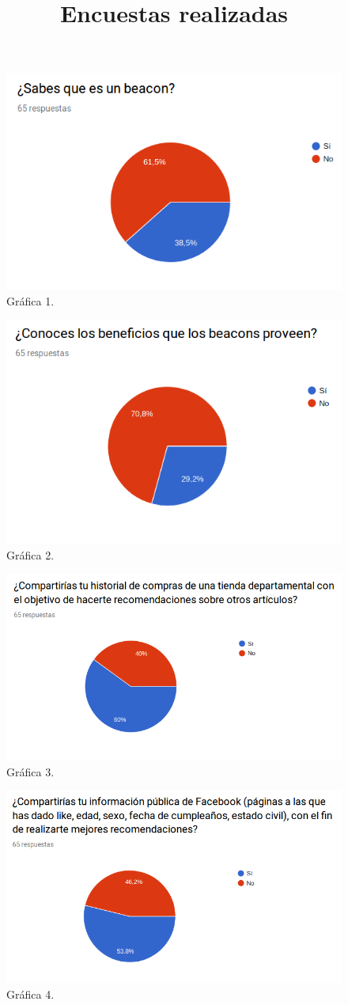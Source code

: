 \title{\textbf{Encuestas realizadas}}

\FloatBarrier
\begin{figure}[htbp!]
		\centering
			\includegraphics[width=.5 \textwidth]{imagenes/graficas/grafico1}
		\caption{Gráfica 1. }
\end{figure}
\FloatBarrier

\FloatBarrier
\begin{figure}[htbp!]
		\centering
			\includegraphics[width=.5 \textwidth]{imagenes/graficas/grafico2}
		\caption{Gráfica 2.}
\end{figure}
\FloatBarrier

\FloatBarrier
\begin{figure}[htbp!]
		\centering
			\includegraphics[width=.7 \textwidth]{imagenes/graficas/grafico3}
		\caption{Gráfica 3. }\end{figure}
\FloatBarrier

\FloatBarrier
\begin{figure}[htbp!]
		\centering
			\includegraphics[width=.7 \textwidth]{imagenes/graficas/grafico4}
		\caption{Gráfica 4. }\end{figure}
\FloatBarrier

